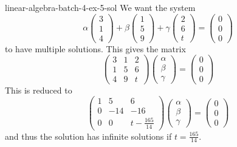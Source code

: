 \documentclass[preview]{standalone}
\begin{document}
\begin{snippetsolution}{linear-algebra-batch-4-ex-5-sol}{}
    We want the system
    \[
        \alpha \begin{pmatrix}
            3 \\ 1 \\ 4
        \end{pmatrix}  
        + \beta \begin{pmatrix}
            1 \\ 5 \\ 9
        \end{pmatrix}
        + \gamma \begin{pmatrix}
            2 \\ 6 \\ t
        \end{pmatrix}
        = \begin{pmatrix}
            0 \\ 0 \\ 0
        \end{pmatrix}  
    \]
    to have multiple solutions. This gives the matrix
    \[
        \begin{pmatrix}
            3 & 1 & 2 \\
            1 & 5 & 6 \\
            4 & 9 & t
        \end{pmatrix}
        \begin{pmatrix}
            \alpha \\ \beta \\ \gamma
        \end{pmatrix}
        =
        \begin{pmatrix}
            0 \\ 0 \\ 0
        \end{pmatrix}
    \]
    This is reduced to
    \[
        \begin{pmatrix}
            1 & 5 & 6 \\
            0 & -14 & -16 \\
            0 & 0 & t - \frac{165}{14}
        \end{pmatrix}
        \begin{pmatrix}
            \alpha \\ \beta \\ \gamma
        \end{pmatrix}
        =
        \begin{pmatrix}
            0 \\ 0 \\ 0
        \end{pmatrix}
    \]
    and thus the solution has infinite solutions if \(t = \frac{165}{14}\).
\end{snippetsolution}
\end{document}
